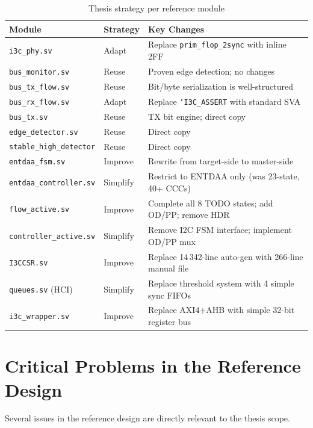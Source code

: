 \documentclass[12pt, a4paper, oneside]{report}
\newcommand{\file}[1]{\texttt{#1}}
\begin{document}
\begin{table}[H]
\centering
\caption{Thesis strategy per reference module}
\label{tab:module_strategy}
\begin{tabularx}{\textwidth}{L{4.5cm} C{2cm} L{7cm}}
\toprule
\textbf{Module} & \textbf{Strategy} & \textbf{Key Changes} \\
\midrule
\file{i3c\_phy.sv}            & Adapt    & Replace \texttt{prim\_flop\_2sync} with inline 2FF \\
\file{bus\_monitor.sv}        & Reuse    & Proven edge detection; no changes \\
\file{bus\_tx\_flow.sv}       & Reuse    & Bit/byte serialization is well-structured \\
\file{bus\_rx\_flow.sv}       & Adapt    & Replace \texttt{`I3C\_ASSERT} with standard SVA \\
\file{bus\_tx.sv}             & Reuse    & TX bit engine; direct copy \\
\file{edge\_detector.sv}      & Reuse    & Direct copy \\
\file{stable\_high\_detector} & Reuse    & Direct copy \\
\file{entdaa\_fsm.sv}         & Improve  & Rewrite from target-side to master-side \\
\file{entdaa\_controller.sv}  & Simplify & Restrict to ENTDAA only (was 23-state, 40+ CCCs) \\
\file{flow\_active.sv}        & Improve  & Complete all 8 TODO states; add OD/PP; remove HDR \\
\file{controller\_active.sv}  & Simplify & Remove I2C FSM interface; implement OD/PP mux \\
\file{I3CCSR.sv}              & Improve  & Replace 14\,342-line auto-gen with 266-line manual file \\
\file{queues.sv} (HCI)        & Simplify & Replace threshold system with 4 simple sync FIFOs \\
\file{i3c\_wrapper.sv}        & Improve  & Replace AXI4+AHB with simple 32-bit register bus \\
\bottomrule
\end{tabularx}
\end{table}

\section{Critical Problems in the Reference Design}

Several issues in the reference design are directly relevant to the thesis scope.
\end{document}
